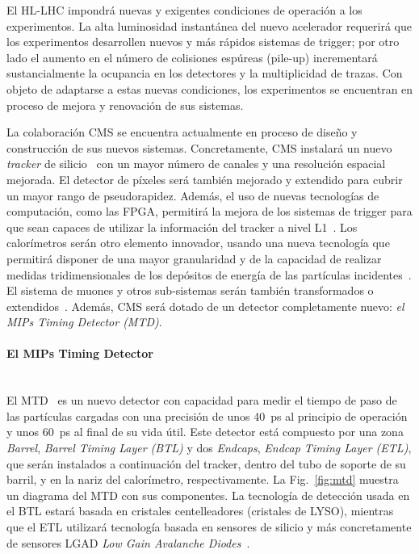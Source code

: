 El HL-LHC impondrá nuevas y exigentes condiciones de operación a los experimentos. La alta luminosidad instantánea del nuevo acelerador requerirá que los experimentos desarrollen nuevos y más rápidos sistemas de trigger; por otro lado el aumento en el número de colisiones espúreas (pile-up) incrementará sustancialmente la ocupancia en los detectores y la multiplicidad de trazas. Con objeto de adaptarse a estas nuevas condiciones, los experimentos se encuentran en proceso de mejora y renovación de sus sistemas. 

La colaboración CMS se encuentra actualmente en proceso de diseño y construcción de sus nuevos sistemas. Concretamente, CMS instalará un nuevo \emph{tracker} de silicio~\cite{upgradeTracker} con un mayor número de canales y una resolución espacial mejorada. El detector de píxeles será también mejorado y extendido para cubrir un mayor rango de pseudorapidez. Además, el uso de nuevas tecnologías de computación, como las FPGA, permitirá la mejora de los sistemas de trigger para que sean capaces de utilizar la información del tracker a nivel L1~\cite{upgradeL1}. Los calorímetros serán otro elemento innovador, usando una nueva tecnología que permitirá disponer de una mayor granularidad y de la capacidad de realizar medidas tridimensionales de los depósitos de energía de las partículas incidentes~\cite{upgradeBarrel, upgradeEndcap}. El sistema de muones y otros sub-sistemas serán también transformados o extendidos~\cite{upgradeMuon}. Además, CMS será dotado de un detector completamente nuevo: \emph{el MIPs Timing Detector (MTD)}.

\paragraph{El MIPs Timing Detector\\\\}

El MTD~\cite{MTDTDR} es un nuevo detector con capacidad para medir el tiempo de paso de las partículas cargadas con una precisión de unos 40~ps al principio de operación y unos 60~ps al final de su vida útil. Este detector está compuesto por una zona \emph{Barrel}, \emph{Barrel Timing Layer (BTL)} y dos \emph{Endcaps}, \emph{Endcap Timing Layer (ETL)}, que serán instalados a continuación del tracker, dentro del tubo de soporte de su barril, y en la nariz del calorímetro, respectivamente. La Fig.~\ref{fig:mtd} muestra un diagrama del MTD con sus componentes. La tecnología de detección usada en el BTL estará basada en cristales centelleadores (cristales de LYSO), mientras que el ETL utilizará tecnología basada en sensores de silicio y más concretamente de sensores LGAD \emph{Low Gain Avalanche Diodes}~\cite{LGAD1,LGAD2}.


